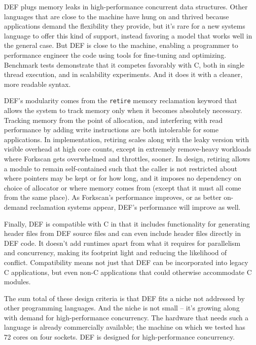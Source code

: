 DEF plugs memory leaks in high-performance concurrent data structures.  Other languages that are close to the machine have hung on and thrived because applications demand the flexibility they provide, but it's rare for a new systems language to offer this kind of support, instead favoring a model that works well in the general case.  But DEF is close to the machine, enabling a programmer to performance engineer the code using tools for fine-tuning and optimizing.  Benchmark tests demonstrate that it competes favorably with C, both in single thread execution, and in scalability experiments.  And it does it with a cleaner, more readable syntax.

DEF's modularity comes from the \texttt{retire} memory reclamation keyword that allows the system to track memory only when it becomes absolutely necessary.  Tracking memory from the point of allocation, and interfering with read performance by adding write instructions are both intolerable for some applications.  In implementation, retiring scales along with the leaky version with visible overhead at high core counts, except in extremely remove-heavy workloads where Forkscan gets overwhelmed and throttles, sooner.  In design, retiring allows a module to remain self-contained such that the caller is not restricted about where pointers may be kept or for how long, and it imposes no dependency on choice of allocator or where memory comes from (except that it must all come from the same place).  As Forkscan's performance improves, or as better on-demand reclamation systems appear, DEF's performance will improve as well.

Finally, DEF is compatible with C in that it includes functionality for generating header files from DEF source files and can even include header files directly in DEF code.  It doesn't add runtimes apart from what it requires for parallelism and concurrency, making its footprint light and reducing the likelihood of conflict.  Compatibility means not just that DEF can be incorporated into legacy C applications, but even non-C applications that could otherwise accommodate C modules.

The sum total of these design criteria is that DEF fits a niche not addressed by other programming languages.  And the niche is not small -- it's growing along with demand for high-performance concurrency.  The hardware that needs such a language is already commercially available; the machine on which we tested has 72 cores on four sockets.  DEF is designed for high-performance concurrency.


